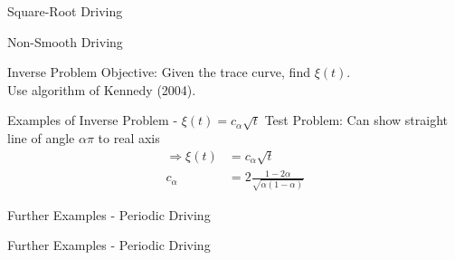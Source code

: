 \documentclass{beamer}
\begin{document}
\begin{frame}{Square-Root Driving}
\begin{adjustbox}{max totalsize={\textwidth}{\textheight}}

\end{adjustbox}
\end{frame}

\begin{frame}{Non-Smooth Driving}
\begin{adjustbox}{max totalsize={\textwidth}{\textheight}}

\end{adjustbox}
\end{frame}

\begin{frame}{Inverse Problem}
    Objective: Given the trace curve, find $\xi(t)$. \\[10pt]
\begin{adjustbox}{max totalsize={\textwidth}{\textheight}}

\end{adjustbox}
Use algorithm of Kennedy (2004).
\end{frame}

\begin{frame}{Examples of Inverse Problem - $\xi(t) = c_\alpha \sqrt{t}$}
Test Problem: Can show straight line of angle $\alpha \pi$ to real axis
\begin{align*}
    \Rightarrow \xi(t) &= c_\alpha \sqrt{t} \\
    c_\alpha &= 2\frac{1-2\alpha}{\sqrt{\alpha(1 - \alpha)}}
\end{align*}
\begin{adjustbox}{max totalsize={\textwidth}{\textheight}}

\end{adjustbox}
\end{frame}

\begin{frame}{Further Examples - Periodic Driving}
\begin{adjustbox}{max totalsize={\textwidth}{\textheight}}

\end{adjustbox}
\end{frame}

\begin{frame}{Further Examples - Periodic Driving}
\begin{adjustbox}{max totalsize={\textwidth}{\textheight}}

\end{adjustbox}
\end{frame}
\end{document}
